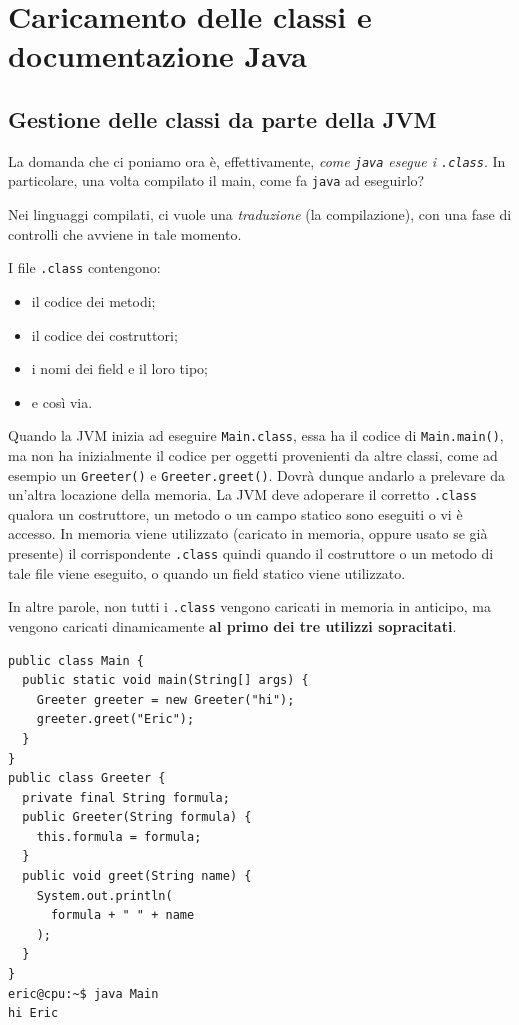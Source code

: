 \documentclass[\fontsizeclass,twocolumn]{\classname}
\theoremstyle{definition}
\theoremstyle{definition}
\begin{document}
\chapter{Caricamento delle classi e documentazione Java}

\section{Gestione delle classi da parte della JVM}

La domanda che ci poniamo ora è, effettivamente, \emph{come \texttt{java}
esegue i \texttt{.class}}. In particolare, una volta compilato il main, come fa
\texttt{java} ad eseguirlo?

Nei linguaggi compilati, ci vuole una \emph{traduzione} (la compilazione), con
una fase di controlli che avviene in tale momento.

I file \texttt{.class} contengono:
\begin{itemize}
    \item il codice dei metodi;
    \item il codice dei costruttori;
    \item i nomi dei field e il loro tipo;
    \item e così via.
\end{itemize}

Quando la JVM inizia ad eseguire \texttt{Main.class}, essa ha il codice di
\texttt{Main.main()}, ma non ha inizialmente il codice per oggetti provenienti
da altre classi, come ad esempio un \texttt{Greeter()} e
\texttt{Greeter.greet()}. Dovrà dunque andarlo a prelevare da un'altra
locazione della memoria. La JVM deve adoperare il corretto \texttt{.class}
qualora un costruttore, un metodo o un campo statico sono eseguiti o vi è
accesso. In memoria viene utilizzato (caricato in memoria, oppure usato se già
presente) il corrispondente \texttt{.class} quindi quando il costruttore o un
metodo di tale file viene eseguito, o quando un field statico viene utilizzato.

In altre parole, non tutti i \texttt{.class} vengono caricati in memoria in
anticipo, ma vengono caricati dinamicamente \textbf{al primo dei tre utilizzi
sopracitati}.


\begin{lstlisting}
public class Main {
  public static void main(String[] args) {
    Greeter greeter = new Greeter("hi");
    greeter.greet("Eric");
  }
}
public class Greeter {
  private final String formula;
  public Greeter(String formula) {
    this.formula = formula;
  }
  public void greet(String name) {
    System.out.println(
      formula + " " + name
    );
  }
}
eric@cpu:~$ java Main
hi Eric
\end{lstlisting}
\end{document}
